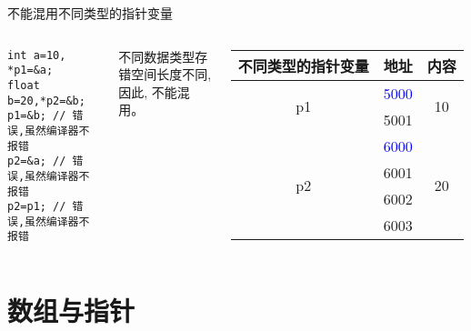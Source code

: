 \begin{frame}{不能混用不同类型的指针变量}
\begin{columns}
\begin{lstlisting}
int a=10, *p1=&a;
float b=20,*p2=&b;
p1=&b; // 错误,虽然编译器不报错
p2=&a; // 错误,虽然编译器不报错
p2=p1; // 错误,虽然编译器不报错
\end{lstlisting}
不同数据类型存错空间长度不同,\\
因此, 不能混用。\\
\medskip
\begin{tabular}{|c|c|c|}
	\hline 
	\scriptsize{不同类型的指针变量} & \textbf{地址} & \textbf{内容} \\ 
	\hline 
	\multirow{2}{*}{p1} & \textcolor{blue}{5000} & \multirow{2}{*}{10} \\ \cline{2-2}  
	& 5001 &  \\ 
	\hline 
	\multirow{4}{*}{p2} & \textcolor{blue}{6000} & \multirow{4}{*}{20} \\ \cline{2-2}  
	& 6001 &  \\ \cline{2-2}  
	& 6002 &  \\ \cline{2-2}
	& 6003 &  \\ 
	\hline 
\end{tabular}
\end{columns}
\end{frame}

\section{数组与指针}


